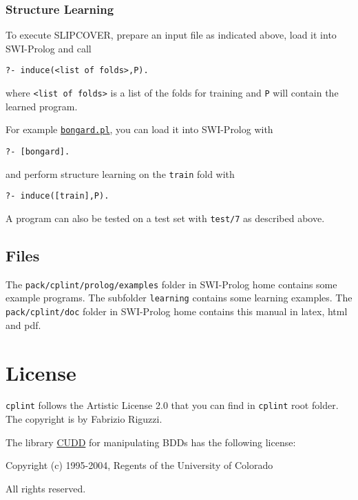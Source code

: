 \documentclass[a4paper,10pt]{scrartcl}
\begin{document}
\subsubsection{Structure Learning}
To execute SLIPCOVER,
prepare an input file as indicated above, load it into SWI-Prolog
and call
\begin{verbatim}
?- induce(<list of folds>,P).
\end{verbatim}
where \verb|<list of folds>| is a list of the folds for training and
\verb|P| will contain the learned program.

For example \href{http://cplint.lamping.unife.it/example/learning/bongard.pl}{\texttt{bongard.pl}}, you can load it into SWI-Prolog
with
\begin{verbatim}
?- [bongard].
\end{verbatim}
and perform structure learning on the \verb|train| fold with 
\begin{verbatim}
?- induce([train],P).
\end{verbatim}
A program can also be tested on a test set with \verb|test/7| as
described above.



\subsection{Files}
The \texttt{pack/cplint/prolog/examples} folder in SWI-Prolog home contains some example programs. The subfolder \texttt{learning} contains some learning examples.
The \texttt{pack/cplint/doc} folder in SWI-Prolog home contains this manual in latex, html and pdf.


\section{License}
\label{license}



\texttt{cplint} follows the Artistic License 2.0 that you can find in \texttt{cplint} root folder. The copyright is by Fabrizio Riguzzi.
\vspace{3mm}


The library \href{http://vlsi.colorado.edu/\string ~fabio/}{CUDD} for manipulating BDDs has the following license:

\vspace{3mm}

Copyright (c) 1995-2004, Regents of the University of Colorado

All rights reserved.
\end{document}
